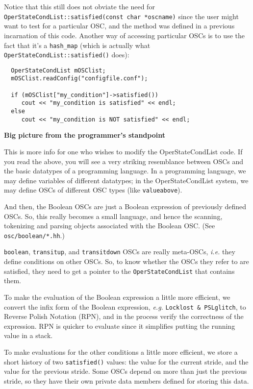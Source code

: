 {Notice that this still does not obviate the need for \texttt{
OperStateCondList::satisfied(const char *oscname)} since the user
might want to test for a particular OSC, and the method was defined in
a previous incarnation of this code.  Another way of accessing
particular OSCs is to use the fact that it's a \texttt{hash\_map}
(which is actually what \texttt{OperStateCondList::satisfied()} does):

\begin{verbatim}
  OperStateCondList mOSClist;
  mOSClist.readConfig("configfile.conf");
  
  if (mOSClist["my_condition"]->satisfied())
     cout << "my_condition is satisfied" << endl;
  else
     cout << "my_condition is NOT satisfied" << endl;
\end{verbatim}


\begin{center}
  \textbf{Big picture from the programmer's standpoint}
\end{center}

This is more info for one who wishes to modify the OperStateCondList
code.  If you read the above, you will see a very striking resemblance
between OSCs and the basic datatypes of a programming language.  In
a programming language, we may define variables of different
datatypes; in the OperStateCondList system, we may define OSCs of
different OSC types (like \texttt{valueabove}).

And then, the Boolean OSCs are just a Boolean expression of previously
defined OSCs.  So, this really becomes a small language, and hence the
scanning, tokenizing and parsing objects associated with the Boolean
OSC.  (See \texttt{osc/boolean/*.hh}.)

\texttt{boolean}, \texttt{transitup}, and \texttt{transitdown} OSCs are really
meta-OSCs, \textit{i.e.} they define conditions on other OSCs.  So, to
know whether the OSCs they refer to are satisfied, they need to get a
pointer to the \texttt{OperStateCondList} that contains them.

To make the evaluation of the Boolean expression a little more
efficient, we convert the infix form of the Boolean expression, \textit{
e.g.} \texttt{Locklost \&\ PSLglitch}, to Reverse Polish Notation
(RPN), and in the process verify the correctness of the expression.
RPN is quicker to evaluate since it simplifies putting the running
value in a stack.

To make evaluations for the other conditions a little more efficient,
we store a short history of two \texttt{satisfied()} values: the value
for the current stride, and the value for the previous stride.  Some
OSCs depend on more than just the previous stride, so they have their
own private data members defined for storing this data. 

}
